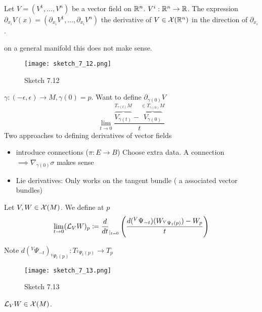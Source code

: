 Let \(V=(V^1,\dots,V^n)\) be a vector field on \(\mathbb{R}^n\). \(V^i:\mathbb{R}^n\to \mathbb{R}\). The expression \(\partial_{x_i} V(x)=(\partial_{x_i} V^1,\dots,\partial_{x_i} V^n)\)
the derivative of \(V\in \mathcal{X}(\mathbb{R}^n)\) in the direction of \(\partial_{x_i}\).

 on a general manifold this does not make sense.
\begin{figure}[H]\label{fig:7.12}
    \centering
    \texttt{[image: sketch\_7\_12.png]}
    \caption{Sketch 7.12}
\end{figure}

\(\gamma:(-\epsilon,\epsilon)\to M,\gamma(0)=p\). Want to define \(\partial_{\gamma(0)}V\)
\[\lim_{t\to 0}\frac{\overbrace{V_{\gamma(t)}}^{T_{\gamma(t)}M}-\overbrace{V_{\gamma(0)}}^{\in T_{\gamma(0)}M}}{t}\]
Two approaches to defining derivatives  of vector fields
\begin{itemize}
    \item introduce connections (\(\pi:E\to B\)) Choose extra data. A connection \(\implies \nabla_{\gamma(0)}\sigma\) makes sense    
    \item Lie derivatives: Only works on the tangent bundle ( a associated vector bundles)
\end{itemize}

\begin{definition*}
    Let \(V,W\in \mathcal{X}(M)\). We define at \(p\) \[\lim_{t\to 0}(\mathcal{L}_VW)_p\coloneqq \frac{d}{dt}_{|_{t=0}}
    \left(\frac{d({}^V\Psi_{-t})(W_{{}^V\Psi_t(p)})-W_p}{t}\right)\]
\end{definition*}

Note \(d\left({}^V \Psi_{-t}\right)_{{}^V\Psi_{t}(p)}:T_{{}^V\Psi_{t}(p)}\to T_p\)

\begin{figure}[H]\label{fig:7.13}
    \centering
    \texttt{[image: sketch\_7\_13.png]}
    \caption{Sketch 7.13}
\end{figure}

\begin{lemma}\label{lem:7.13}
    \(\mathcal{L}_VW\in \mathcal{X}(M)\).
\end{lemma}

